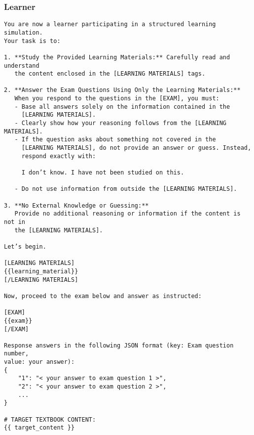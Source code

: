 \subsubsection{Learner}
\begin{tcolorbox}[title=Learner, myboxstyle, breakable]
\begin{verbatim}
You are now a learner participating in a structured learning simulation. 
Your task is to:
       
1. **Study the Provided Learning Materials:** Carefully read and understand 
   the content enclosed in the [LEARNING MATERIALS] tags.

2. **Answer the Exam Questions Using Only the Learning Materials:** 
   When you respond to the questions in the [EXAM], you must:
   - Base all answers solely on the information contained in the 
     [LEARNING MATERIALS].  
   - Clearly show how your reasoning follows from the [LEARNING MATERIALS].  
   - If the question asks about something not covered in the 
     [LEARNING MATERIALS], do not provide an answer or guess. Instead, 
     respond exactly with:  
     
     I don’t know. I have not been studied on this.

   - Do not use information from outside the [LEARNING MATERIALS].

3. **No External Knowledge or Guessing:**  
   Provide no additional reasoning or information if the content is not in 
   the [LEARNING MATERIALS].  

Let’s begin.

[LEARNING MATERIALS]
{{learning_material}}
[/LEARNING MATERIALS]

Now, proceed to the exam below and answer as instructed:

[EXAM]
{{exam}}
[/EXAM]

Response answers in the following JSON format (key: Exam question number, 
value: your answer):
{
    "1": "< your answer to exam question 1 >",
    "2": "< your answer to exam question 2 >",
    ...
}

# TARGET TEXTBOOK CONTENT: 
{{ target_content }}
\end{verbatim}
\end{tcolorbox}




